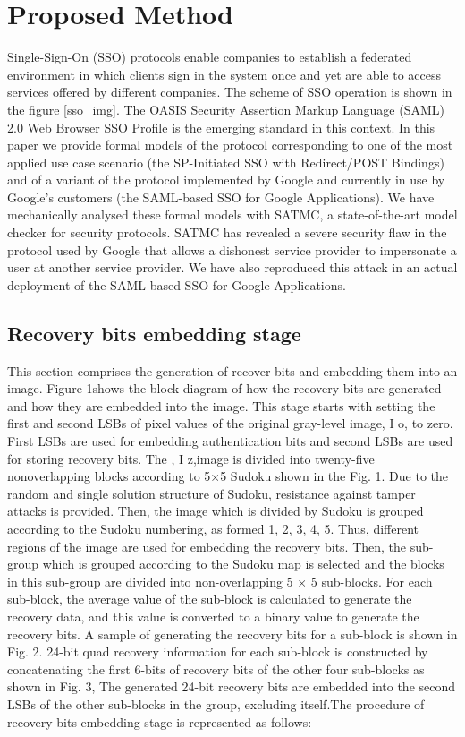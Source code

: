\documentclass[draft, {\secondLanguage}, english]{volcanica-template}
\begin{document}
 

\section{ Proposed Method}
Single-Sign-On (SSO) protocols enable companies to establish a federated environment in which clients sign in the system once and yet are able to access services offered by different companies. The scheme of SSO operation is shown in the figure \ref{sso_img}. The OASIS Security Assertion Markup Language (SAML) 2.0 Web Browser SSO Profile is the emerging standard in this context. In this paper we provide formal models of the protocol corresponding to one of the most applied use case scenario (the SP-Initiated SSO with Redirect/POST Bindings) and of a variant of the protocol implemented by Google and currently in use by Google’s customers (the SAML-based SSO for Google Applications). We have mechanically analysed these formal models with SATMC, a state-of-the-art model checker for security protocols. SATMC has revealed a severe security flaw in the protocol used by Google that allows a dishonest service provider to impersonate a user at another service provider. We have also reproduced this attack in an actual deployment of the SAML-based SSO for Google Applications.

\subsection{Recovery bits embedding stage}\label{sec:02a}
This section comprises the generation of recover bits and embedding them into an image. Figure 1shows the block diagram of how the recovery bits are generated and how they are embedded into the image. This stage starts with setting the first and second LSBs of pixel values of the original gray-level image, I o, to zero. First LSBs are used for embedding authentication bits and second LSBs are used for storing recovery bits. The , I z,image is divided into twenty-five nonoverlapping blocks according to 5×5 Sudoku shown in the Fig. 1. Due to the random and single solution structure of Sudoku, resistance against tamper attacks is provided. Then, the image which is divided by Sudoku is grouped according to the Sudoku numbering, as formed 1, 2, 3, 4, 5. Thus, different regions of the image are used for embedding the recovery bits. Then, the sub-group which is grouped according to the Sudoku map is selected and the blocks in this sub-group are divided into non-overlapping 5 × 5 sub-blocks. For each sub-block, the average value of the sub-block is calculated to generate the recovery data, and this value is converted to a binary value to generate the recovery bits. A sample of generating the recovery bits for a sub-block is shown in Fig. 2. 24-bit quad recovery information for each sub-block is constructed by concatenating the first 6-bits of recovery bits of the other four sub-blocks as shown in Fig. 3, The generated 24-bit recovery bits are embedded into the second LSBs of the other sub-blocks in the group, excluding itself.The procedure of recovery bits embedding stage is represented as follows:
    
\end{document}
